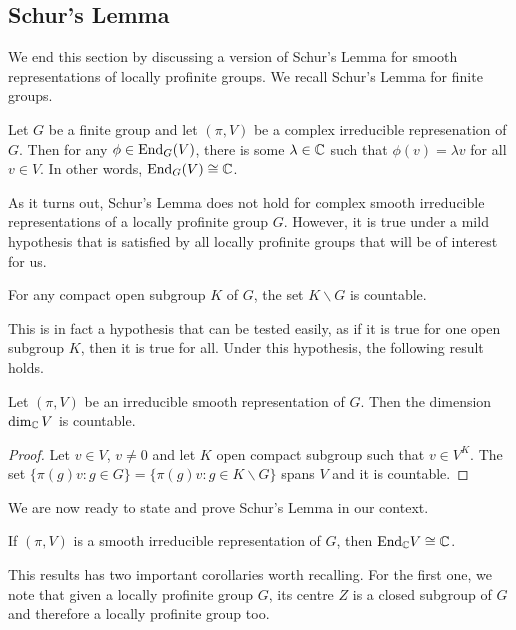 \subsection{Schur's Lemma}

We end this section by discussing a version of Schur's Lemma for smooth representations of locally profinite groups. We recall Schur's Lemma for finite groups.

\begin{thm}
    Let $G$ be a finite group and let $(\pi,V)$ be a complex irreducible represenation of $G$. Then for any $\phi\in\mathrm{End}_G(V)$, there is some $\lambda\in\mathbb{C}$ such that $\phi(v)=\lambda v$ for all $v\in V$. In other words, $\mathrm{End}_G(V)\cong\mathbb{C}$.
\end{thm}

As it turns out, Schur's Lemma does not hold for complex smooth irreducible representations of a locally profinite group $G$. However, it is true under a mild hypothesis that is satisfied by all locally profinite groups that will be of interest for us.

\begin{hypothesis}
    For any compact open subgroup $K$ of $G$, the set $K\backslash G$ is countable.
\end{hypothesis}

This is in fact a hypothesis that can be tested easily, as if it is true for one open subgroup $K$, then it is true for all. Under this hypothesis, the following result holds.

\begin{lemma}
    Let $(\pi,V)$ be an irreducible smooth representation of $G$. Then the dimension $\dim_{\mathbb{C}}V$ is countable.
\end{lemma}
\begin{proof}
    Let $v\in V$, $v\neq0$ and let $K$ open compact subgroup such that $v\in V^K$. The set $\{\pi(g)v:g\in G\}=\{\pi(g)v:g\in K\backslash G\}$ spans $V$ and it is countable.
\end{proof}

We are now ready to state and prove Schur's Lemma in our context.

\begin{thm}
    If $(\pi,V)$ is a smooth irreducible representation of $G$, then $\mathrm{End}_{\mathbb{C}}V\cong \mathbb{C}$.
\end{thm}

This results has two important corollaries worth recalling. For the first one, we note that given a locally profinite group $G$, its centre $Z$ is a closed subgroup of $G$ and therefore a locally profinite group too.

